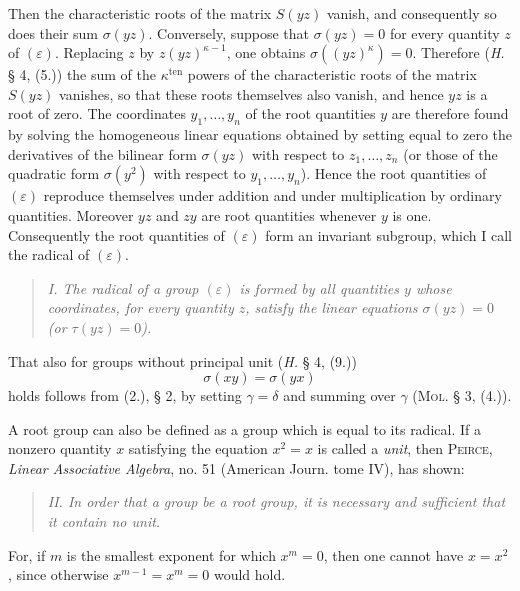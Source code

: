 \documentclass[11pt]{article}
\newcommand{\eps}{\varepsilon}
\newcommand{\ten}{\mathrm{ten}}
\begin{document}
Then the characteristic roots of the matrix $S(yz)$ vanish, and consequently so does their sum $\sigma(yz)$. Conversely, suppose that $\sigma(yz)=0$ for every quantity $z$ of $(\eps)$. Replacing $z$ by $z(yz)^{\kappa-1}$, one obtains $\sigma((yz)^\kappa)=0$. Therefore (\emph{H.} § 4, (5.)) the sum of the $\kappa^{\ten}$ powers of the characteristic roots of the matrix $S(yz)$ vanishes, so that these roots themselves also vanish, and hence $yz$ is a root of zero. The coordinates $y_1,\ldots,y_n$ of the root quantities $y$ are therefore found by solving the homogeneous linear equations obtained by setting equal to zero the derivatives of the bilinear form $\sigma(yz)$ with respect to $z_1,\ldots,z_n$ (or those of the quadratic form $\sigma(y^2)$ with respect to $y_1,\ldots,y_n$). Hence the root quantities of $(\eps)$ reproduce themselves under addition and under multiplication by ordinary quantities. Moreover $yz$ and $zy$ are root quantities whenever $y$ is one. Consequently the root quantities of $(\eps)$ form an invariant subgroup, which I call the radical of $(\eps)$.

\begin{quote}\itshape
I. The radical of a group $(\eps)$ is formed by all quantities $y$ whose coordinates, for every quantity $z$, satisfy the linear equations $\sigma(yz)=0$ (or $\tau(yz)=0$).
\end{quote}

That also for groups without principal unit (\emph{H.} § 4, (9.))
\begin{equation}\tag{2.}
 \sigma(xy)=\sigma(yx)
\end{equation}
holds follows from (2.), § 2, by setting $\gamma=\delta$ and summing over $\gamma$ (\textsc{Mol}. § 3, (4.)).

A root group can also be defined as a group which is equal to its radical. If a nonzero quantity $x$ satisfying the equation $x^2=x$ is called a \emph{unit}, then \textsc{Peirce}, \emph{Linear Associative Algebra}, no. 51 (American Journ. tome IV), has shown:

\begin{quote}\itshape
II. In order that a group be a root group, it is necessary and sufficient that it contain no unit.
\end{quote}

For, if $m$ is the smallest exponent for which $x^m=0$, then one cannot have $x=x^2$, since otherwise $x^{m-1}=x^m=0$ would hold.
\end{document}
